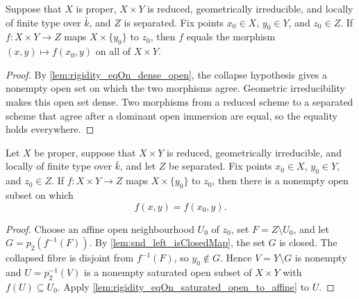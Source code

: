 \begin{lemma}
  \label{lem:rigidity_core}
  \leanok
  Suppose that \(X\) is proper, \(X\times Y\) is reduced, geometrically irreducible,
  and locally of finite type over \(\bar k\), and \(Z\) is separated.  Fix points
  \(x_0\in X\), \(y_0\in Y\), and \(z_0\in Z\).  If
  \(f\colon X\times Y\to Z\) maps \(X\times\{y_0\}\) to \(z_0\), then \(f\)
  equals the morphism \((x,y)\mapsto f(x_0,y)\) on all of \(X\times Y\).
\end{lemma}
\begin{proof}
  \leanok
  By \cref{lem:rigidity_eqOn_dense_open}, the collapse hypothesis gives a nonempty
  open set on which the two morphisms agree.  Geometric irreducibility makes this open
  set dense.  Two morphisms from a reduced scheme to a separated scheme that agree
  after a dominant open immersion are equal, so the equality holds everywhere.
\end{proof}

\begin{lemma}
  \label{lem:rigidity_eqOn_dense_open}
  \leanok
  Let \(X\) be proper, suppose that \(X\times Y\) is reduced, geometrically
  irreducible, and locally of finite type over \(\bar k\), and let \(Z\) be separated.
  Fix points \(x_0\in X\), \(y_0\in Y\), and \(z_0\in Z\).  If
  \(f\colon X\times Y\to Z\) maps \(X\times\{y_0\}\) to \(z_0\), then there is a
  nonempty open subset on which
  \[
    f(x,y)=f(x_0,y).
  \]
\end{lemma}
\begin{proof}
  \leanok
  Choose an affine open neighbourhood \(U_0\) of \(z_0\), set
  \(F=Z\setminus U_0\), and let \(G=p_2(f^{-1}(F))\).  By
  \cref{lem:snd_left_isClosedMap}, the set \(G\) is closed.  The collapsed fibre is
  disjoint from \(f^{-1}(F)\), so \(y_0\notin G\).  Hence
  \(V=Y\setminus G\) is nonempty and \(U=p_2^{-1}(V)\) is a nonempty saturated
  open subset of \(X\times Y\) with \(f(U)\subseteq U_0\).  Apply
  \cref{lem:rigidity_eqOn_saturated_open_to_affine} to \(U\).
\end{proof}

